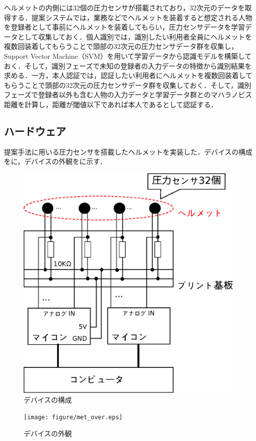 \documentclass[Japanese,noauthor]{dicomopapers}
\begin{document}
ヘルメットの内側には32個の圧力センサが搭載されており，32次元のデータを取得する．提案システムでは，業務などでヘルメットを装着すると想定される人物を登録者として事前にヘルメットを装着してもらい，圧力センサデータを学習データとして収集しておく．個人識別では，識別したい利用者全員にヘルメットを複数回装着してもらうことで頭部の32次元の圧力センサデータ群を収集し，Support Vector Machine（SVM）を用いて学習データから認識モデルを構築しておく．そして，識別フェーズで未知の登録者の入力データの特徴から識別結果を求める．一方，本人認証では，認証したい利用者にヘルメットを複数回装着してもらうことで頭部の32次元の圧力センサデータ群を収集しておく．そして，識別フェーズで登録者以外も含む人物の入力データと学習データ群とのマハラノビス距離を計算し，距離が閾値以下であれば本人であるとして認証する．

\subsection{ハードウェア}
提案手法に用いる圧力センサを搭載したヘルメットを実装した．デバイスの構成をに，デバイスの外観をに示す．\par

\begin{figure}[!t]
  \begin{center}
    \includegraphics[width=0.65\linewidth]{figure/device.eps}
  \end{center}
  \caption{デバイスの構成}
  \label{device}
\end{figure}

\begin{figure}[!t]
  \begin{center}
    \texttt{[image: figure/met\_over.eps]}
  \end{center}
  \caption{デバイスの外観}
  \label{met_over}
\end{figure}
\end{document}
